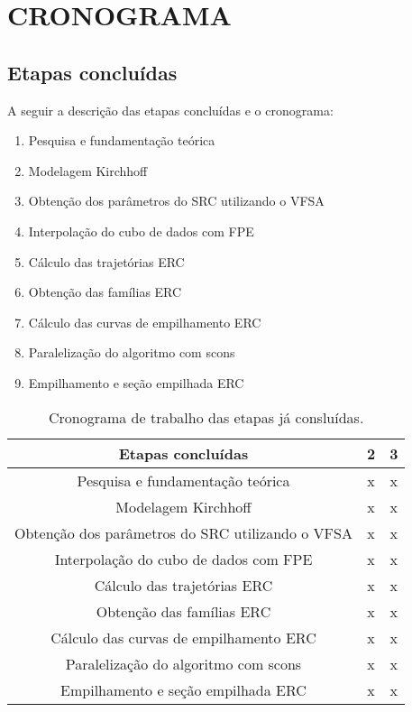 \chapter{CRONOGRAMA}
\label{cap9:cronograma}


\section{Etapas concluídas}

A seguir a descrição das etapas concluídas e o cronograma:

  \begin{enumerate}
   \item  Pesquisa e fundamentação teórica
   \item   Modelagem Kirchhoff
    \item Obtenção dos parâmetros do SRC utilizando o VFSA
    \item  Interpolação do cubo de dados com FPE
    \item  Cálculo das trajetórias ERC
     \item Obtenção das famílias ERC
    \item  Cálculo das curvas de empilhamento ERC
     \item Paralelização do algoritmo com scons
    \item  Empilhamento e seção empilhada ERC
  \end{enumerate}

    \begin{table}[H]
      \caption{Cronograma de trabalho das etapas já consluídas.}
      \centering
      
      \begin{tabular}{|c|c|c|}

      \hline
      \textbf{Etapas concluídas} & 2 & 3 \\ \hline
      Pesquisa e fundamentação teórica & x & x \\ \hline
      Modelagem Kirchhoff & x & x \\ \hline
      Obtenção dos parâmetros do SRC utilizando o VFSA & x & x \\ \hline
      Interpolação do cubo de dados com FPE & x & x \\ \hline
      Cálculo das trajetórias ERC & x & x \\ \hline
      Obtenção das famílias ERC & x & x \\ \hline
      Cálculo das curvas de empilhamento ERC & x & x \\ \hline
      Paralelização do algoritmo com scons & x & x \\ \hline
      Empilhamento e seção empilhada ERC & x & x  \\
      \hline
      
      \end{tabular}
  \end{table}
  
